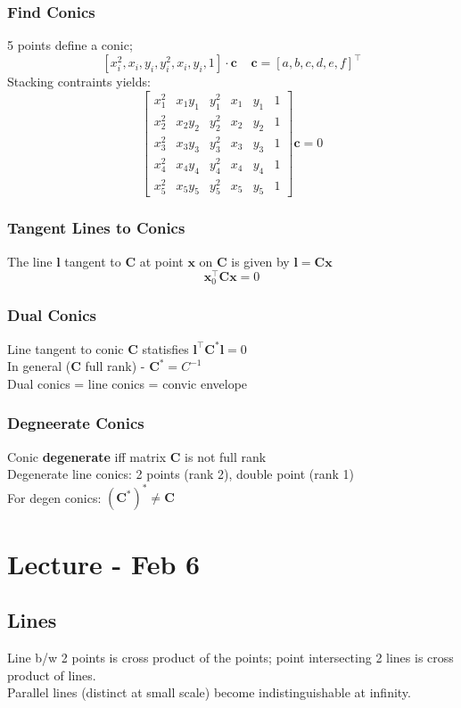 \documentclass{article}
\begin{document}
\subsubsection{Find Conics}
5 points define a conic;
\[
    [x_i^2, x_i, y_i, y_i^2, x_i, y_i, 1] \cdot \mathbf c \ \ \ \ \ \mathbf c = [a,b,c,d,e,f]^\top
\]
Stacking contraints yields:
\[
    \begin{bmatrix}
        x_1^2 & x_1y_1 & y_1^2 & x_1 & y_1 & 1 \\[5pt]
        x_2^2 & x_2y_2 & y_2^2 & x_2 & y_2 & 1 \\[5pt]
        x_3^2 & x_3y_3 & y_3^2 & x_3 & y_3 & 1 \\[5pt]
        x_4^2 & x_4y_4 & y_4^2 & x_4 & y_4 & 1 \\[5pt]
        x_5^2 & x_5y_5 & y_5^2 & x_5 & y_5 & 1
    \end{bmatrix}\mathbf c = 0
\]

\subsubsection{Tangent Lines to Conics}
The line $\mathbf l$ tangent to $\mathbf C$ at point $\mathbf x$ on $\mathbf C$ is given
by $\mathbf l = \mathbf C \mathbf x$ 
\[
    \mathbf x_0 ^\top \mathbf C \mathbf x = 0
\]

\subsubsection{Dual Conics}
Line tangent to conic $\mathbf C$ statisfies $\mathbf l^\top \mathbf C^* \mathbf l =0$
\\
In general ($\mathbf C$ full rank) - $\mathbf C^* = C^{-1}$
\\
Dual conics = line conics = convic envelope
\subsubsection{Degneerate Conics}
Conic \textbf{degenerate} iff matrix $\mathbf C$ is not full rank
\\
Degenerate line conics: 2 points (rank 2), double point (rank 1)\\
For degen conics: $(\mathbf C^*)^* \ne \mathbf C$ 


\section{Lecture - Feb 6}
\subsection{Lines}
Line b/w 2 points is cross product of the points; point intersecting 2 lines 
is cross product of lines.
\\
Parallel lines (distinct at small scale) become indistinguishable at infinity.
\end{document}
